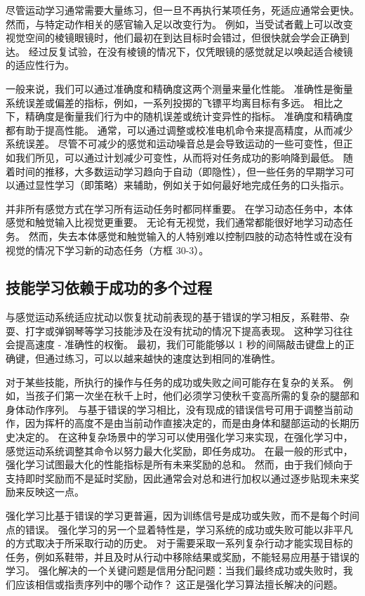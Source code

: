 尽管运动学习通常需要大量练习，但一旦不再执行某项任务，死适应通常会更快。
然而，与特定动作相关的感官输入足以改变行为。
例如，当受试者戴上可以改变视觉空间的棱镜眼镜时，他们最初在到达目标时会错过，但很快就会学会正确到达。
经过反复试验，在没有棱镜的情况下，仅凭眼镜的感觉就足以唤起适合棱镜的适应性行为。


一般来说，我们可以通过准确度和精确度这两个测量来量化性能。
准确性是衡量系统误差或偏差的指标，例如，一系列投掷的飞镖平均离目标有多远。
相比之下，精确度是衡量我们行为中的随机误差或统计变异性的指标。
准确度和精确度都有助于提高性能。
通常，可以通过调整或校准电机命令来提高精度，从而减少系统误差。
尽管不可减少的感觉和运动噪音总是会导致运动的一些可变性，但正如我们所见，可以通过计划减少可变性，从而将对任务成功的影响降到最低。
随着时间的推移，大多数运动学习趋向于自动（即隐性），但一些任务的早期学习可以通过显性学习（即策略）来辅助，例如关于如何最好地完成任务的口头指示。


并非所有感觉方式在学习所有运动任务时都同样重要。
在学习动态任务中，本体感觉和触觉输入比视觉更重要。 无论有无视觉，我们通常都能很好地学习动态任务。
然而，失去本体感觉和触觉输入的人特别难以控制四肢的动态特性或在没有视觉的情况下学习新的动态任务（方框 30-3）。



\subsection{技能学习依赖于成功的多个过程}

与感觉运动系统适应扰动以恢复扰动前表现的基于错误的学习相反，系鞋带、杂耍、打字或弹钢琴等学习技能涉及在没有扰动的情况下提高表现。
这种学习往往会提高速度 - 准确性的权衡。
最初，我们可能能够以 1 秒的间隔敲击键盘上的正确键，但通过练习，可以以越来越快的速度达到相同的准确性。


对于某些技能，所执行的操作与任务的成功或失败之间可能存在复杂的关系。
例如，当孩子们第一次坐在秋千上时，他们必须学习使秋千变高所需的复杂的腿部和身体动作序列。
与基于错误的学习相比，没有现成的错误信号可用于调整当前动作，因为挥杆的高度不是由当前动作直接决定的，而是由身体和腿部运动的长期历史决定的。
在这种复杂场景中的学习可以使用强化学习来实现，在强化学习中，感觉运动系统调整其命令以努力最大化奖励，即任务成功。
在最一般的形式中，强化学习试图最大化的性能指标是所有未来奖励的总和。
然而，由于我们倾向于支持即时奖励而不是延时奖励，因此通常会对总和进行加权以通过逐步贴现未来奖励来反映这一点。


强化学习比基于错误的学习更普遍，因为训练信号是成功或失败，而不是每个时间点的错误。
强化学习的另一个显着特性是，学习系统的成功或失败可能以非平凡的方式取决于所采取行动的历史。
对于需要采取一系列复杂行动才能实现目标的任务，例如系鞋带，并且及时从行动中移除结果或奖励，不能轻易应用基于错误的学习。
强化解决的一个关键问题是信用分配问题：当我们最终成功或失败时，我们应该相信或指责序列中的哪个动作？
这正是强化学习算法擅长解决的问题。


